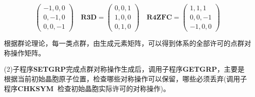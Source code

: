 \begin{itemize}
\begin{displaymath}
\begin{pmatrix}
		-1, 0, 0 \\ 
		0,-1, 0 \\
		0, 0, -1
	\end{pmatrix}\quad
	\mathbf{R3D}=
	\begin{pmatrix}
		0, 0, 1 \\ 
		1, 0, 0 \\
		0, 1, 0
	\end{pmatrix}\quad
	\mathbf{R4ZFC}=
	\begin{pmatrix}
		1, 1, 1 \\ 
		0, 0, -1 \\
		-1, 0, 0
	\end{pmatrix}
\end{displaymath}
\end{itemize}
根据群论理论，每一类点群，由生成元素矩阵，可以得到体系的全部许可的点群对称操作矩阵。

(2)子程序\textbf{SETGRP}完成点群对称操作生成后，调用子程序\textbf{GETGRP}，主要是根据当前初始晶胞原子位置，检查哪些对称操作可以保留，哪些必须丢弃(调用子程序\textbf{CHKSYM~}检查初始晶胞实际许可的对称操作)。

